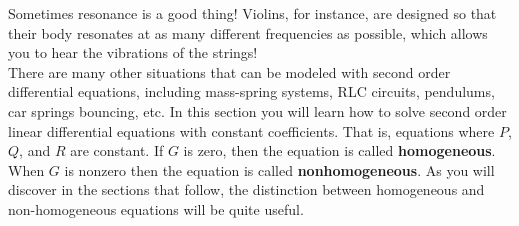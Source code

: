 Sometimes resonance is a good thing!  Violins, for instance, are designed so that their body resonates at as many different frequencies as possible, which allows you to hear the vibrations of the strings! \\

There are many other situations that can be modeled with second order differential equations, including mass-spring systems, RLC circuits, pendulums, car springs bouncing, etc. In this section you will learn how to solve second order linear differential equations with constant coefficients. That is, equations where $P$, $Q$, and $R$ are constant. If $G$ is zero, then the equation is called \textbf{homogeneous}. When $G$ is nonzero then the equation is called \textbf{nonhomogeneous}. As you will discover in the sections that follow, the distinction between homogeneous and non-homogeneous equations will be quite useful.

\clearpage



